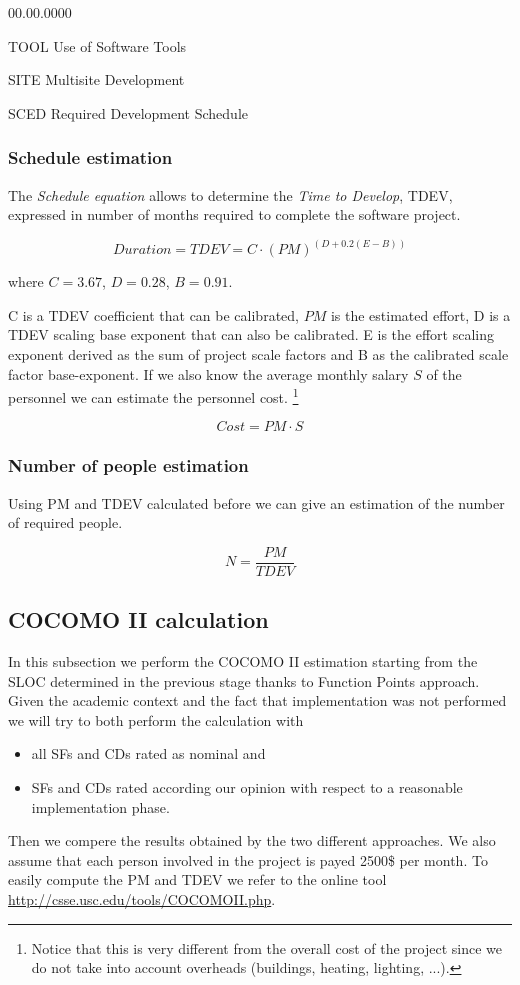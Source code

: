 \begin{itemize}
\begin{lyxlist}{00.00.0000}
\item [{TOOL}] Use of Software Tools 
\item [{SITE}] Multisite Development 
\item [{SCED}] Required Development Schedule 
\end{lyxlist}
\end{itemize}

\subsubsection{Schedule estimation }

The \emph{Schedule equation} allows to determine the \emph{Time to
Develop}, TDEV, expressed in number of months required to complete
the software project.

\[
Duration=TDEV=C\cdot(PM)^{(D+0.2(E-B))}
\]


where $C=3.67$, $D=0.28$, $B=0.91$.

C is a TDEV coefficient that can be calibrated, $PM$ is the estimated
effort, D is a TDEV scaling base exponent that can also be calibrated.
E is the effort scaling exponent derived as the sum of project scale
factors and B as the calibrated scale factor base-exponent. If we
also know the average monthly salary $S$ of the personnel we can
estimate the personnel cost.%
\footnote{Notice that this is very different from the overall cost of the project
since we do not take into account overheads (buildings, heating, lighting,
...).%
}

\[
Cost=PM\cdot S
\]



\subsubsection{Number of people estimation }

Using PM and TDEV calculated before we can give an estimation of the
number of required people.

\[
N=\frac{PM}{TDEV}
\]



\subsection{COCOMO II calculation}

In this subsection we perform the COCOMO II estimation starting from
the SLOC determined in the previous stage thanks to Function Points
approach. Given the academic context and the fact that implementation
was not performed we will try to both perform the calculation with
\begin{itemize}
\item all SFs and CDs rated as nominal and
\item SFs and CDs rated according our opinion with respect to a reasonable
implementation phase.
\end{itemize}
Then we compere the results obtained by the two different approaches.
We also assume that each person involved in the project is payed 2500\$
per month. To easily compute the PM and TDEV we refer to the online
tool \url{http://csse.usc.edu/tools/COCOMOII.php}.



